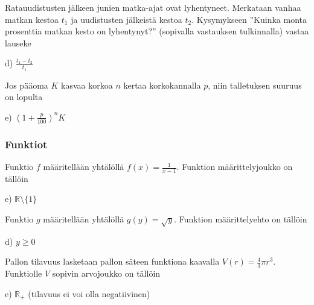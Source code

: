 \begin{tehtava}
Ratauudistusten jälkeen junien matka-ajat ovat lyhentyneet. Merkataan vanhaa matkan kestoa $t_1$ ja uudistusten jälkeistä kestoa $t_2$. Kysymykseen ''Kuinka monta prosenttia matkan kesto on lyhentynyt?'' (sopivalla vastauksen tulkinnalla) vastaa lauseke
	\begin{vastaus}
d) $\frac{t_1-t_2}{t_1}$
	\end{vastaus}
\end{tehtava}

\begin{tehtava}
Jos pääoma $K$ kasvaa korkoa $n$ kertaa korkokannalla $p$, niin talletuksen suuruus on lopulta
	\begin{vastaus}
e) $(1+\frac{p}{100})^nK$
	\end{vastaus}
\end{tehtava}

\subsubsection*{Funktiot}

\begin{tehtava}
Funktio $f$ määritellään yhtälöllä $f(x)=\frac{1}{x-1}$. Funktion määrittelyjoukko on tällöin
    \begin{vastaus}
	 e) $\mathbb{R}\setminus \lbrace 1 \rbrace$
    \end{vastaus}
\end{tehtava}

\begin{tehtava}
Funktio $g$ määritellään yhtälöllä $g(y)=\sqrt{y}$. Funktion määrittelyehto on tällöin
    \begin{vastaus}
	 d) $y\geq 0$
    \end{vastaus}
\end{tehtava}

\begin{tehtava}
Pallon tilavuus lasketaan pallon säteen funktiona kaavalla $V(r)=\frac{4}{3}\pi r^3$. Funktiolle $V$ sopivin arvojoukko on tällöin
	\begin{vastaus}
	e) $\mathbb{R}_+$ (tilavuus ei voi olla negatiivinen)
	\end{vastaus}
\end{tehtava}

